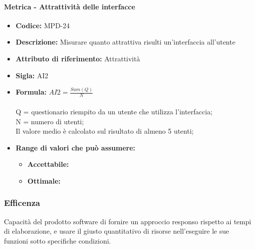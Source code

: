                   \paragraph{Metrica - Attrattività delle interfacce} 
            \begin{itemize}
           \item   \textbf{Codice:} MPD-24
           \item   \textbf{Descrizione:} Misurare quanto attrattiva risulti un'interfaccia all'utente                  
            \item \textbf{Attributo di riferimento:} Attrattività
            \item  \textbf{Sigla:} AI2
           \item   \textbf{Formula:} \begin{math}AI2 = \frac{Sum(Q)}{N}\end{math}\\ \\
            Q = questionario riempito da un utente che utilizza l'interfaccia;\\
            N = numero di utenti;\\
            Il valore medio è calcolato sul risultato di almeno 5 utenti;
            \item \textbf{Range di valori che può assumere:}
        \begin{itemize}
            \item \textbf{Accettabile:} 
            \item \textbf{Ottimale:} 
        \end{itemize}
       \end{itemize}
       
                     \subsubsection{Efficenza}
   Capacità del prodotto software di fornire un approccio responso rispetto ai tempi di elaborazione, e usare il giusto quantitativo di risorse nell'eseguire le sue funzioni sotto specifiche condizioni. 
   

